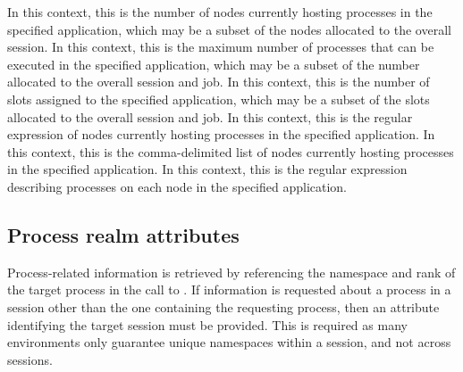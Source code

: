 %
In this context, this is the number of
nodes currently hosting processes in the specified application, which may be a
subset of the nodes allocated to the overall session.
\pasteAttributeItemEnd{}
%
%
%
%
In this context, this is the maximum number of processes that can be executed in the specified application, which may be a subset of the number allocated to the overall session and job.
\pasteAttributeItemEnd{}
%
In this context, this is the number of
slots assigned to the specified application, which may be a subset of the slots
allocated to the overall session and job.
\pasteAttributeItemEnd{}
%
%
In this context, this is the regular expression of nodes currently hosting processes in the specified application.
\pasteAttributeItemEnd{}
%
In this context, this is the comma-delimited list of nodes currently hosting processes in the specified application.
\pasteAttributeItemEnd{}
%
In this context, this is the regular expression describing processes on each node in the specified application.
\pasteAttributeItemEnd{}
%
%

\subsection{Process realm attributes}
\label{chap:api_rsvd_keys:prealm}

Process-related information is retrieved by referencing the namespace
and rank of the target process in the call to . If information
is requested about a process in a session other than the one containing the
requesting process, then an attribute identifying the target session must be
provided. This is required as many environments only guarantee unique
namespaces within a session, and not across sessions.

